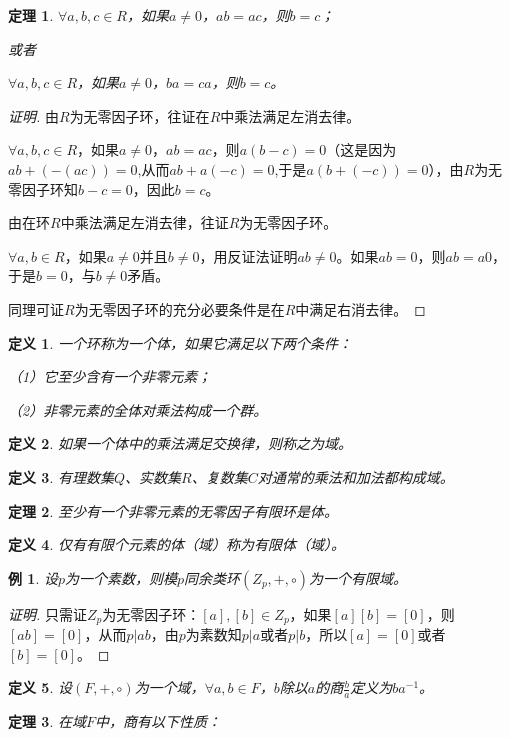 \documentclass{article}
\newtheorem{Def}{定义}
\newtheorem{Thm}{定理}
\newtheorem*{Example}{例}
\begin{document}
\begin{CJK*}{UTF8}{gbsn}
\begin{Thm}
    $\forall a,b,c\in R$，如果$a\neq 0$，$ab=ac$，则$b=c$；
  
    或者
  
    $\forall a,b,c\in R$，如果$a\neq 0$，$ba=ca$，则$b=c$。
  
  \end{Thm}
  \begin{proof}[证明]
    由$R$为无零因子环，往证在$R$中乘法满足左消去律。
  
    $\forall a,b,c\in R$，如果$a\neq 0$，$ab=ac$，则$a(b-c)=0$（这是因为$ab+(-(ac))=0$,从而$ab+a(-c)=0$,于是$a(b+(-c))=0$），由$R$为无零因子环知$b-c=0$，因此$b=c$。
  
    由在环$R$中乘法满足左消去律，往证$R$为无零因子环。
  
  
    $\forall a,b\in R$，如果$a\neq 0$并且$b\neq 0$，用反证法证明$ab\neq 0$。如果$ab=0$，则$ab=a0$，于是$b=0$，与$b\neq 0$矛盾。
  
    同理可证$R$为无零因子环的充分必要条件是在$R$中满足右消去律。
  \end{proof}
  \begin{Def}
    一个环称为一个体，如果它满足以下两个条件：
  
    （1）它至少含有一个非零元素；
  
    （2）非零元素的全体对乘法构成一个群。
  \end{Def}
  
  \begin{Def}
    如果一个体中的乘法满足交换律，则称之为域。
  \end{Def}
  \begin{Def}
    有理数集$Q$、实数集$R$、复数集$C$对通常的乘法和加法都构成域。
  \end{Def}
  \begin{Thm}
    至少有一个非零元素的无零因子有限环是体。
  \end{Thm}
  \begin{Def}
    仅有有限个元素的体（域）称为有限体（域）。
  \end{Def}
  \begin{Example}
    设$p$为一个素数，则模$p$同余类环$(Z_p,+,\circ)$为一个有限域。
  \end{Example}
  \begin{proof}[证明]
    只需证$Z_p$为无零因子环：\forall $[a],[b]\in Z_p$，如果$[a][b]=[0]$，则$[ab]=[0]$，从而$p|ab$，由$p$为素数知$p|a$或者$p|b$，所以$[a]=[0]$或者$[b]=[0]$。
  \end{proof}
  \begin{Def}
    设$(F,+,\circ)$为一个域，$\forall a,b\in F$，$b$除以$a$的商$\frac{b}{a}$定义为$ba^{-1}$。
  \end{Def}
  \begin{Thm}
    在域$F$中，商有以下性质：
  

\end{Thm}
\end{CJK*}
\end{document}
